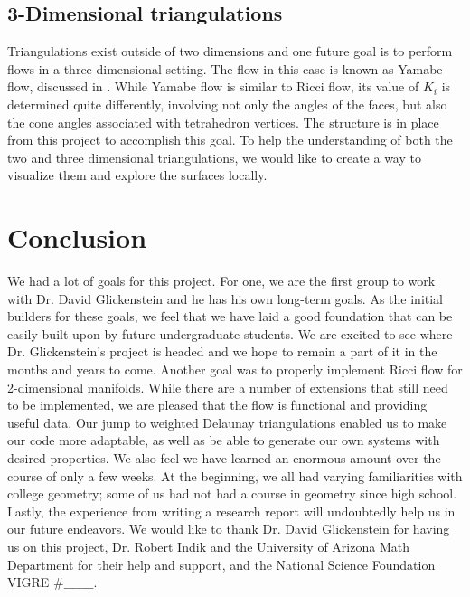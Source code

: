 \documentclass[12pt]{article}
\begin{document}
\subsection{3-Dimensional triangulations}
Triangulations exist outside of two dimensions and one future goal is to perform flows in a three dimensional setting. The flow in this case is known as Yamabe flow, discussed in \cite{DrG}. While Yamabe flow is similar to Ricci flow, its value of $K_i$ is determined quite differently, involving not only the angles of the faces, but also the cone angles associated with tetrahedron vertices. The structure is in place from this project to accomplish this goal. To help the understanding of both the two and three dimensional triangulations, we would like to create a way to visualize them and explore the surfaces locally.\newline

\section{Conclusion}

We had a lot of goals for this project. For one, we are the first group to work with Dr. David Glickenstein and he has his own long-term goals. As the initial builders for these goals, we feel that we have laid a good foundation that can be easily built upon by future undergraduate students. We are excited to see where Dr. Glickenstein's project is headed and we hope to remain a part of it in the months and years to come. Another goal was to properly implement Ricci flow for 2-dimensional manifolds. While there are a number of extensions that still need to be implemented, we are pleased that the flow is functional and providing useful data. Our jump to weighted Delaunay triangulations enabled us to make our code more adaptable, as well as be able to generate our own systems with desired properties. We also feel we have learned an enormous amount over the course of only a few weeks. At the beginning, we all had varying familiarities with college geometry; some of us had not had a course in geometry since high school. Lastly, the experience from writing a research report will undoubtedly help us in our future endeavors. We would like to thank Dr. David Glickenstein for having us on this project, Dr. Robert Indik and the University of Arizona Math Department for their help and support, and the National Science Foundation VIGRE $\#\_\_\_\_\_\_\_$.

\newpage
  

\end{document}
